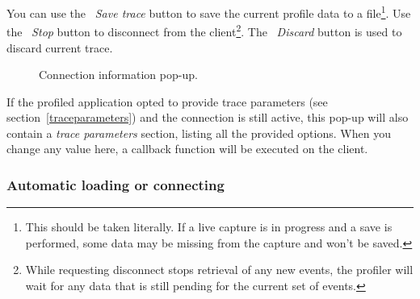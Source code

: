 \documentclass[hidelinks,titlepage,a4paper]{article}
\begin{document}
You can use the \faSave{}~\emph{Save trace} button to save the current profile data to a file\footnote{This should be taken literally. If a live capture is in progress and a save is performed, some data may be missing from the capture and won't be saved.}. Use the \faPlug{}~\emph{Stop} button to disconnect from the client\footnote{While requesting disconnect stops retrieval of any new events, the profiler will wait for any data that is still pending for the current set of events.}. The \faExclamationTriangle{}~\emph{Discard} button is used to discard current trace.

\begin{figure}[h]
\centering{}
\caption{Connection information pop-up.}
\label{connectioninfo}
\end{figure}

If the profiled application opted to provide trace parameters (see section~\ref{traceparameters}) and the connection is still active, this pop-up will also contain a \emph{trace parameters} section, listing all the provided options. When you change any value here, a callback function will be executed on the client.

\subsubsection{Automatic loading or connecting}
\end{document}
